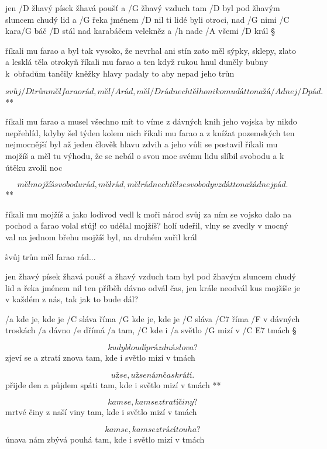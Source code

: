 
jen /D žhavý písek žhavá poušť a /G žhavý vzduch tam /D byl
pod žhavým sluncem chudý lid a /G řeka jménem /D nil
ti lidé byli otroci, nad /G nimi /C kara/G báč /D stál
nad karabáčem velekněz a /h nade /A všemi /D král \S

říkali mu farao a byl tak vysoko, že nevrhal ani stín
zato měl sýpky, sklepy, zlato a lesklá těla otrokyň \s
říkali mu farao a ten když rukou hnul duněly bubny k~obřadům
tančily kněžky hlavy padaly to aby nepad jeho trůn \s

\R \[ svůj /D trůn měl farao rád, měl /A rád, měl /D rád
   nechtěl ho nikomu dát to na žá/A dnej /D pád. \]**

říkali mu farao a musel všechno mít to víme z dávných knih
jeho vojska by nikdo nepřehlíd, kdyby šel týden kolem nich \s
říkali mu farao a z knížat pozemských ten nejmocnější byl
až jeden člověk hlavu zdvih a jeho vůli se postavil \s
říkali mu mojžíš a měl tu výhodu, že se nebál o svou moc
svému lidu slíbil svobodu a k útěku zvolil noc \s

\R \[ měl mojžíš svobodu rád, měl rád, měl rád
   nechtěl se svobody vzdát to na žádnej pád.\]**

říkali mu mojžíš a jako lodivod vedl k moři národ svůj
za ním se vojsko dalo na pochod a farao volal stůj! \s
co udělal mojžíš? holí udeřil, vlny se zvedly v mocný val
na jednom břehu mojžíš byl, na druhém zuřil král \s

\r svůj trůn měl farao rád...

jen žhavý písek žhavá poušť a žhavý vzduch tam byl
pod žhavým sluncem chudý lid a řeka jménem nil \s
ten příběh dávno odvál čas, jen krále neodvál
kus mojžíše je v každém z nás, tak jak to bude dál?




/a kde je, kde je /C sláva říma
/G kde je, kde je /C sláva /C7 říma
/F v dávných troskách /a dávno /e dřímá
/a tam, /C kde i /a světlo /G mizí v /{C E7} tmách \S

\[ kudy bloudí prázdná slova? \]
zjeví se a ztratí znova
tam, kde i světlo mizí v tmách \s

\R \[ už se, už se nám čas krátí. \]
   přijde den a půjdem spáti
   tam, kde i světlo mizí v tmách **

\[ kam se, kam se ztratí činy? \]
mrtvé činy z naší viny
tam, kde i světlo mizí v tmách \s

\[ kam se, kam se ztrácí touha? \]
únava nám zbývá pouhá
tam, kde i světlo mizí v tmách \s

